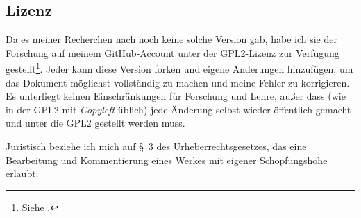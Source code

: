 \subsection*{Lizenz}

Da es meiner Recherchen nach noch keine solche Version gab, habe ich sie der
Forschung auf meinem GitHub-Account unter der GPL2-Lizenz zur Verfügung
gestellt\footnote{Siehe .}.
Jeder kann diese Version forken und eigene Änderungen hinzufügen, um das
Dokument möglichst vollständig zu machen und meine Fehler zu korrigieren.
Es unterliegt keinen Einschränkungen für Forschung und Lehre, außer dass
(wie in der GPL2 mit \textit{Copyleft} üblich) jede Änderung selbst wieder
öffentlich gemacht und unter die GPL2 gestellt werden muss.

Juristisch beziehe ich mich auf §~3 des Urheberrechtsgesetzes, das eine
Bearbeitung und Kommentierung eines Werkes mit eigener Schöpfungshöhe
erlaubt.

\newpage

\printbibliography[keyword={own}]

\newpage
{}
\setcounter{footnote}{0}
\setcounter{page}{173}
\let\thefootnote\originalthefootnote
